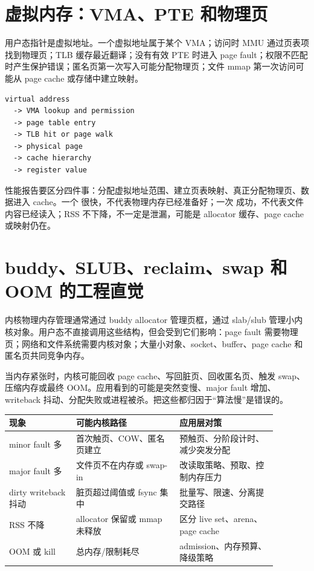 \section{虚拟内存：VMA、PTE 和物理页}

用户态指针是虚拟地址。一个虚拟地址属于某个 VMA；访问时 MMU 通过页表项找到物理页；TLB 缓存最近翻译；没有有效 PTE 时进入 page fault；权限不匹配时产生保护错误；匿名页第一次写入可能分配物理页；文件 mmap 第一次访问可能从 page cache 或存储中建立映射。

\begin{lstlisting}[numbers=none,caption={一次用户态 load 背后的内存边界}]
virtual address
  -> VMA lookup and permission
  -> page table entry
  -> TLB hit or page walk
  -> physical page
  -> cache hierarchy
  -> register value
\end{lstlisting}

性能报告要区分四件事：分配虚拟地址范围、建立页表映射、真正分配物理页、数据进入 cache。一个  很快，不代表物理内存已经准备好；一次  成功，不代表文件内容已经读入；RSS 不下降，不一定是泄漏，可能是 allocator 缓存、page cache 或映射仍在。

\section{buddy、SLUB、reclaim、swap 和 OOM 的工程直觉}

内核物理内存管理通常通过 buddy allocator 管理页框，通过 slab/slub 管理小内核对象。用户态不直接调用这些结构，但会受到它们影响：page fault 需要物理页；网络和文件系统需要内核对象；大量小对象、socket、buffer、page cache 和匿名页共同竞争内存。

当内存紧张时，内核可能回收 page cache、写回脏页、回收匿名页、触发 swap、压缩内存或最终 OOM。应用看到的可能是突然变慢、major fault 增加、writeback 抖动、分配失败或进程被杀。把这些都归因于“算法慢”是错误的。

\begin{center}
\small
\begin{tabular}{p{0.22\linewidth}p{0.34\linewidth}p{0.32\linewidth}}
\toprule
现象 & 可能内核路径 & 应用层对策 \\
\midrule
minor fault 多 & 首次触页、COW、匿名页建立 & 预触页、分阶段计时、减少突发分配 \\
major fault 多 & 文件页不在内存或 swap-in & 改读取策略、预取、控制内存压力 \\
dirty writeback 抖动 & 脏页超过阈值或 fsync 集中 & 批量写、限速、分离提交路径 \\
RSS 不降 & allocator 保留或 mmap 未释放 & 区分 live set、arena、page cache \\
OOM 或 kill & 总内存/限制耗尽 & admission、内存预算、降级策略 \\
\bottomrule
\end{tabular}
\end{center}

